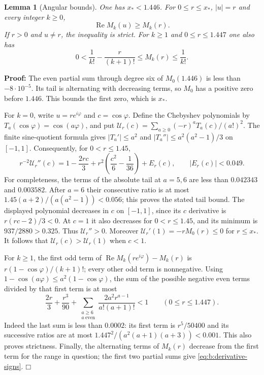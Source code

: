 \documentclass[a4paper,10pt]{article}
\numberwithin{equation}{section}
\theoremstyle{paperplain}
\newtheorem{lmm}[thm]{Lemma}
\theoremstyle{paperremark}
\theoremstyle{paperplain}
\newenvironment{prf}{\noindent \textbf{Proof: }}{\hfill $\mdlgwhtsquare$\par\addvspace{0.5\baselineskip}}
\begin{document}
\begin{lmm}[Angular bounds]\label{lmm:b:angular}
One has $x_*<1.446$. For $0\leq r\leq x_*$, $|u|=r$ and
every integer $k\geq0$,
\begin{equation}\label{eq:b:angular}
 \operatorname{Re}M_k(u)\geq M_k(r).
\end{equation}
If $r>0$ and $u\ne r$, the inequality is strict. For $k\geq1$
and $0\leq r\leq1.447$ one also has
\begin{equation}\label{eq:b:derivative-signs}
 0<\frac1{k!}-\frac r{(k+1)!}
                  \leq M_k(r)\leq\frac1{k!}.
\end{equation}
\end{lmm}
\begin{prf}
The even partial sum through degree six of $M_0(1.446)$ is less
than $-8\cdot10^{-5}$. Its tail is alternating with decreasing
terms, so $M_0$ has a positive zero before $1.446$. This bounds
the first zero, which is $x_*$.

For $k=0$, write $u=re^{i\varphi}$ and $c=\cos\varphi$.
Define the Chebyshev polynomials by
$T_a(\cos\varphi)=\cos(a\varphi)$, and put
$\mathcal U_r(c)=\sum_{a\geq0}(-r)^aT_a(c)/(a!)^2$.
The finite sine-quotient formula gives
$|T_a'|\leq a^2$ and
$|T_a''|\leq a^2(a^2-1)/3$ on $[-1,1]$.
Consequently, for $0<r\leq1.45$,
\[
 r^{-2}\mathcal U_r''(c)
 =1-\frac{2r c}{3}
       +r^2\left(\frac{c^2}{6}-\frac1{36}\right)+E_r(c),
 \qquad |E_r(c)|<0.049.
\]
For completeness, the terms of the absolute tail at $a=5,6$ are
less than $0.042343$ and $0.003582$. After $a=6$ their consecutive
ratio is at most
$1.45(a+2)/(a(a^2-1))<0.056$; this proves the stated tail bound.
The displayed polynomial decreases in $c$ on $[-1,1]$, since
its $c$ derivative is $r(rc-2)/3<0$. At $c=1$ it also decreases for
$0<r\leq1.45$, and its minimum is $937/2880>0.325$.
Thus $\mathcal U_r''>0$. Moreover
$\mathcal U_r'(1)=-rM_0(r)\leq0$ for $r\leq x_*$.
It follows that $\mathcal U_r(c)>\mathcal U_r(1)$ when $c<1$.

For $k\geq1$, the first odd term of
$\operatorname{Re}M_k(re^{i\varphi})-M_k(r)$ is
$r(1-\cos\varphi)/(k+1)!$; every other odd term is nonnegative.
Using $1-\cos(a\varphi)\leq a^2(1-\cos\varphi)$, the sum of the
possible negative even terms divided by that first term is at most
\[
 \frac{2r}{3}+\frac{r^3}{90}
       +\sum_{\substack{a\geq6\\a\ \text{even}}}
                         \frac{2a^2r^{a-1}}{a!(a+1)!}<1
                       \qquad(0\leq r\leq1.447).
\]
Indeed the last sum is less than $0.0002$: its first term is
$r^5/50400$ and its successive ratios are at most
$1.447^2/(a^2(a+1)(a+3))<0.001$.
This also proves strictness. Finally, the alternating terms of
$M_k(r)$ decrease from the first term for the range in question;
the first two partial sums give \eqref{eq:b:derivative-signs}.
\end{prf}
\end{document}

